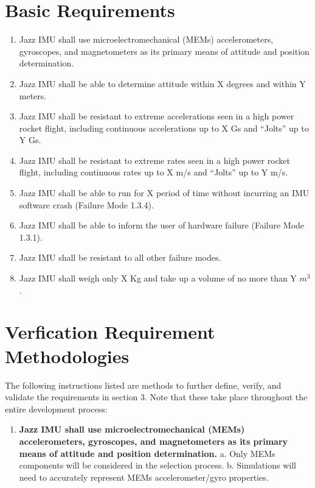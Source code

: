 \documentclass[14pt,a4paper]{article}
\begin{document}
\begin{CenturySchool}
		\section{Basic Requirements}
		
			\begin{enumerate}
				\item Jazz IMU shall use microelectromechanical (MEMs) accelerometers, gyroscopes, and magnetometers as its primary means of attitude and position determination.
				
				\item Jazz IMU shall be able to determine attitude within X degrees and within Y meters.
				
				\item Jazz IMU shall be resistant to extreme accelerations seen in a high power rocket flight, including continuous accelerations up to X Gs and “Jolts” up to Y Gs.
				
				\item Jazz IMU shall be resistant to extreme rates seen in a high power rocket flight, including continuous rates up to X m/s and “Jolts” up to Y m/s.
				
				\item Jazz IMU shall be able to run for X period of time without incurring an IMU software crash (Failure Mode 1.3.4).
				
				\item Jazz IMU shall be able to inform the user of hardware failure (Failure Mode 1.3.1).
				
				\item Jazz IMU shall be resistant to all other failure modes.
				
				\item Jazz IMU shall weigh only X Kg and take up a volume of no more than Y \(m^3\).
				 
			\end{enumerate}
			
			\section{Verfication Requirement Methodologies}
			
			The following instructions listed are methods to further define, verify, and validate the requirements in section 3. Note that these take place throughout the entire development process:
			
				\begin{enumerate}
					\item{\bfseries Jazz IMU shall use microelectromechanical (MEMs) accelerometers, gyroscopes, and magnetometers as its primary means of attitude and position determination.}
					\subitem a.	Only MEMs components will be considered in the selection process.
					\subitem b.	Simulations will need to accurately represent MEMs accelerometer/gyro properties.
					

\end{enumerate}
\end{CenturySchool}
\end{document}
